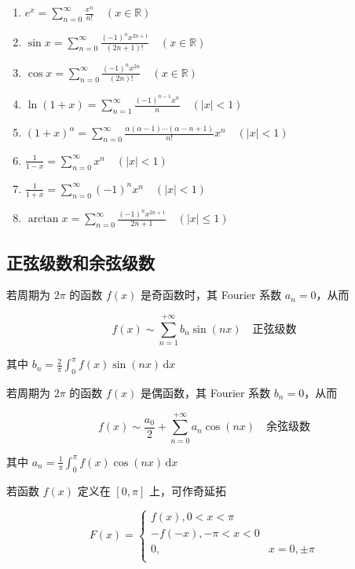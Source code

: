 \documentclass[lang = zh , final , oneside , openany , titlepage , zihao = -4 , linespread = 1.3 , baselineskip = false , cjk-font = windows , text-font = newtx , math-font = newtx , math-style = TeX]{sjtureport}
\begin{document}
\begin{enumerate}
\item
  \(\displaystyle e^x = \sum_{n=0}^\infty \frac{x^n}{n!} \quad (x\in\mathbb{R})\)
\item
  \(\displaystyle \sin x = \sum_{n=0}^\infty \frac{(-1)^nx^{2n+1}}{(2n+1)!} \quad (x\in\mathbb{R})\)
\item
  \(\displaystyle \cos x = \sum_{n=0}^\infty \frac{(-1)^nx^{2n}}{(2n)!} \quad (x\in\mathbb{R})\)
\item
  \(\displaystyle \ln(1+x) = \sum_{n=1}^\infty \frac{(-1)^{n-1}x^n}{n} \quad (\left\vert x \right\vert<1)\)
\item
  \(\displaystyle (1+x)^\alpha = \sum_{n=0}^\infty \frac{\alpha(\alpha-1)\cdots(\alpha-n+1)}{n!}x^n \quad (\left\vert x\right\vert<1)\)
\item
  \(\displaystyle \frac{1}{1-x} = \sum_{n=0}^\infty x^n \quad (\left\vert x\right\vert<1)\)
\item
  \(\displaystyle \frac{1}{1+x} = \sum_{n=0}^\infty (-1)^nx^n \quad (\left\vert x\right\vert<1)\)
\item
  \(\displaystyle \arctan{x} = \sum_{n=0}^\infty \frac{(-1)^n x^{2n+1}}{2n+1} \quad (\left\vert x\right\vert\leq 1)\)
\end{enumerate}

\subsection{正弦级数和余弦级数}

若周期为 \(2\pi\) 的函数 \(f(x)\) 是奇函数时，其 Fourier 系数
\(a_n=0\)，从而

\[f(x) \sim \sum_{n=1}^{+\infty}b_n\sin(nx)\quad\text{正弦级数}\]

其中
\(\displaystyle b_n =\frac{2}{\pi}\int_0^\pi f(x)\sin(nx) \,\mathrm{d}x\)

若周期为 \(2\pi\) 的函数 \(f(x)\) 是偶函数，其 Fourier 系数
\(b_n=0\)，从而

\[f(x) \sim \frac{a_0}{2}+\sum_{n=0}^{+\infty}a_n\cos(nx)\quad\text{余弦级数}\]

其中
\(\displaystyle a_n =\frac{1}{\pi}\int_0^\pi f(x)\cos(nx) \,\mathrm{d}x\)

若函数 \(f(x)\) 定义在 \([0,\pi]\) 上，可作奇延拓

\[F(x)=
\begin{cases}
  f(x),  0< x< \pi\\
  -f(-x),  -\pi < x < 0\\
  0, & x=0,\pm\pi\\
\end{cases}\]
\end{document}
